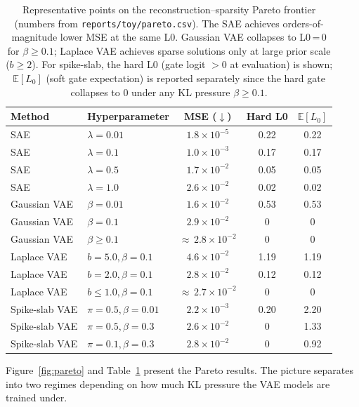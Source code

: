 \documentclass{article}
\begin{document}
\begin{table}[t]
  \caption{Representative points on the reconstruction--sparsity Pareto frontier (numbers from \texttt{reports/toy/pareto.csv}). The SAE achieves orders-of-magnitude lower MSE at the same L0. Gaussian VAE collapses to L0\,=\,0 for $\beta \geq 0.1$; Laplace VAE achieves sparse solutions only at large prior scale ($b \geq 2$). For spike-slab, the hard L0 (gate logit $>0$ at evaluation) is shown; $\mathbb{E}[L_0]$ (soft gate expectation) is reported separately since the hard gate collapses to 0 under any KL pressure $\beta \geq 0.1$.}
  \label{tab:pareto}
  \centering
  \begin{tabular}{llccc}
    \toprule
    Method & Hyperparameter & MSE ($\downarrow$) & Hard L0 & $\mathbb{E}[L_0]$ \\
    \midrule
    SAE & $\lambda = 0.01$ & $1.8\times10^{-5}$ & 0.22 & 0.22 \\
    SAE & $\lambda = 0.1$  & $1.0\times10^{-3}$ & 0.17 & 0.17 \\
    SAE & $\lambda = 0.5$  & $1.7\times10^{-2}$ & 0.05 & 0.05 \\
    SAE & $\lambda = 1.0$  & $2.6\times10^{-2}$ & 0.02 & 0.02 \\
    \midrule
    Gaussian VAE & $\beta = 0.01$ & $1.6\times10^{-2}$ & 0.53 & 0.53 \\
    Gaussian VAE & $\beta = 0.1$  & $2.9\times10^{-2}$ & 0    & 0    \\
    Gaussian VAE & $\beta \geq 0.1$ & ${\approx}\,2.8\times10^{-2}$ & 0 & 0 \\
    \midrule
    Laplace VAE & $b = 5.0, \beta = 0.1$ & $4.6\times10^{-2}$ & 1.19 & 1.19 \\
    Laplace VAE & $b = 2.0, \beta = 0.1$ & $2.8\times10^{-2}$ & 0.12 & 0.12 \\
    Laplace VAE & $b \leq 1.0, \beta = 0.1$ & ${\approx}\,2.7\times10^{-2}$ & 0 & 0 \\
    \midrule
    Spike-slab VAE & $\pi = 0.5, \beta = 0.01$ & $2.2\times10^{-3}$ & 0.20 & 2.20 \\
    Spike-slab VAE & $\pi = 0.5, \beta = 0.3$  & $2.6\times10^{-2}$ & 0    & 1.33 \\
    Spike-slab VAE & $\pi = 0.1, \beta = 0.3$  & $2.8\times10^{-2}$ & 0    & 0.92 \\
    \bottomrule
  \end{tabular}
\end{table}

Figure~\ref{fig:pareto} and Table~\ref{tab:pareto} present the Pareto results. The picture separates into two regimes depending on how much KL pressure the VAE models are trained under.
\end{document}
